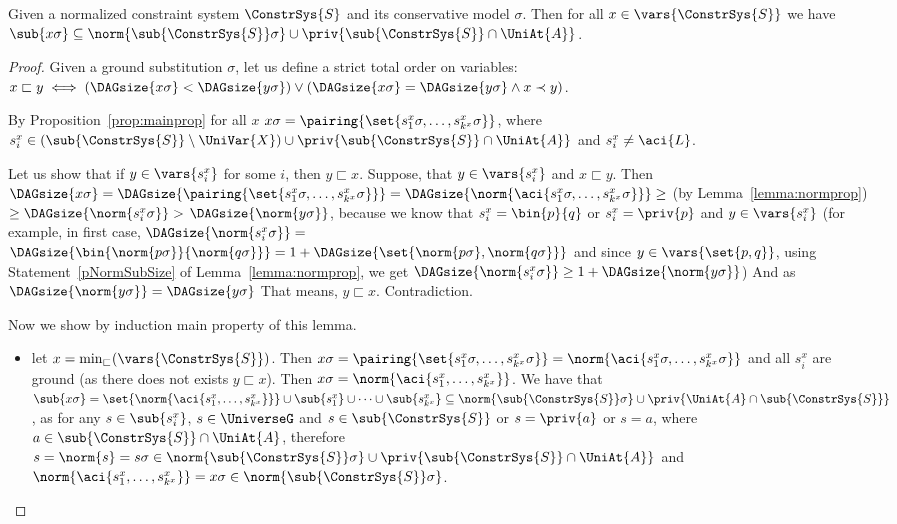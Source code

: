 \begin{lemma}\label{lemma:subsigma}
	Given a normalized constraint system $\ConstrSys{S}$ and its conservative model $\sigma$. Then for all $x \in \vars{\ConstrSys{S}}$ we have $\sub{x\sigma}\subseteq \norm{\sub{\ConstrSys{S}}\sigma}\cup \priv{\sub{\ConstrSys{S}}\cap\UniAt{A}}$.
\begin{proof}
	Given a ground substitution $\sigma$, let us define a  strict total order on variables: $x\sqsubset y \iff (\DAGsize{x\sigma}<\DAGsize{y\sigma}) \vee (\DAGsize{x\sigma}=\DAGsize{y\sigma} \wedge x\prec y)$.
	
	By Proposition~\ref{prop:mainprop} for all $x$ $x\sigma = \pairing{\set{s^x_1\sigma, \dots, s^x_{k^x}\sigma}}$, where  $s^x_i \in (\sub{\ConstrSys{S}} \setminus \UniVar{X})\cup \priv{\sub{\ConstrSys{S}}\cap\UniAt{A}}$  and $s^x_i\neq \aci{L}$. 

Let us show that if $y\in\vars{s^x_i}$ for some $i$, then $y\sqsubset x$.
	Suppose, that $y\in\vars{s^x_i}$ and $x\sqsubset y$. 
	Then $\DAGsize{x\sigma}  = \DAGsize{\pairing{\set{s^x_1\sigma, \dots, s^x_{k^x}\sigma}}} = 
	\DAGsize{\norm{\aci{s^x_1\sigma,\dots, s^x_{k^x}\sigma}}} \geq$ 
	(by Lemma~\ref{lemma:normprop}) 
	$ \geq \DAGsize{\norm{s^x_i\sigma}}> $ \br $ \DAGsize{\norm{y\sigma}}$,  
	because we know that $s^x_i=\bin{p}{q}$ or $s^x_i=\priv{p}$ and $y\in\vars{s^x_i}$ 
	(for example, in first case, $\DAGsize{\norm{s^x_i\sigma}} =  $ \br $ \DAGsize{\bin{\norm{p\sigma}}{\norm{q\sigma}}}=
	  1+\DAGsize{\set{\norm{p\sigma},\norm{q\sigma}}}$ and   \br  since $y\in\vars{\set{p,q}}$, 
	  using Statement~\ref{pNormSubSize} of Lemma~\ref{lemma:normprop}, 
	  we get   \br   $\DAGsize{\norm{s^x_i\sigma}} \geq 1+ \DAGsize{\norm{y\sigma}}$)
	And as $\DAGsize{\norm{y\sigma}} = \DAGsize{y\sigma}$ 
	That means, $y\sqsubset x$. Contradiction.
	
	Now we show by induction main property of this lemma.
	\begin{itemize}
		\item let $x=\min_{\sqsubset}(\vars{\ConstrSys{S}})$. \br 
		Then $ x\sigma = \pairing{\set{s^x_1\sigma, \dots, s^x_{k^x}\sigma}}= \norm{\aci{s^x_1\sigma, \dots, s^x_{k^x}\sigma}}$ and 
		 all $s^x_i$ \br are ground  (as there does not exists $y \sqsubset x$). 
		Then $x\sigma=\norm{\aci{s^x_1, \dots{}, s^x_{k^x}}}$.
 We have that $\sub{x\sigma}=\set{\norm{\aci{s^x_1, \dots, s^x_{k^x}}}}\cup\sub{s^x_1}\cup\dots\cup\sub{s^x_{k^x}} \subseteq \norm{\sub{\ConstrSys{S}}\sigma}\cup\priv{\UniAt{A}\cap\sub{\ConstrSys{S}}}$, 
as for any $s\in\sub{s^x_i}$, $s\in\UniverseG$ and $s\in\sub{\ConstrSys{S}}$ or $s=\priv{a}$ or $s=a$, where $a\in \sub{\ConstrSys{S}}\cap \UniAt{A}$, therefore  $s=\norm{s}=s\sigma\in\norm{\sub{\ConstrSys{S}}\sigma}\cup \priv{\sub{\ConstrSys{S}}\cap \UniAt{A}}$ 
and 
$\norm{\aci{s^x_1, \dots, s^x_{k^x}}} = x \sigma \in \norm{\sub{\ConstrSys{S}}\sigma}$.


\end{itemize}
\end{proof}
\end{lemma}
